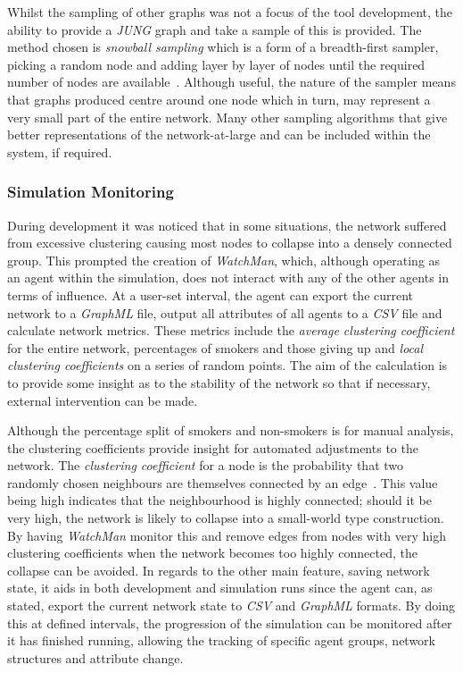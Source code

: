 \documentclass[]{report}
\begin{document}
Whilst the sampling of other graphs was not a focus of the tool development, the ability to provide a \emph{JUNG} graph and take a sample of this is provided. The method chosen is \emph{snowball sampling} which is a form of a breadth-first sampler, picking a random node and adding layer by layer of nodes until the required number of nodes are available~\cite{snowball}. Although useful, the nature of the sampler means that graphs produced centre around one node which in turn, may represent a very small part of the entire network. Many other sampling algorithms that give better representations of the network-at-large and can be included within the system, if required.


\subsubsection{Simulation Monitoring}
During development it was noticed that in some situations, the network suffered from excessive clustering causing most nodes to collapse into a densely connected group. This prompted the creation of \emph{WatchMan}, which, although operating as an agent within the simulation, does not interact with any of the other agents in terms of influence. At a user-set interval, the agent can export the current network to a \emph{GraphML} file, output all attributes of all agents to a \emph{CSV} file and calculate network metrics. These metrics include the \emph{average clustering coefficient} for the entire network, percentages of smokers and those giving up and \emph{local clustering coefficients} on a series of random points. The aim of the calculation is to provide some insight as to the stability of the network so that if necessary, external intervention can be made.

Although the percentage split of smokers and non-smokers is for manual analysis, the clustering coefficients provide insight for automated adjustments to the network. The \emph{clustering coefficient} for a node is the probability that two randomly chosen neighbours are themselves connected by an edge~\cite{NetMark-44-cluster}. This value being high indicates that the neighbourhood is highly connected; should it be very high, the network is likely to collapse into a small-world type construction. By having \emph{WatchMan} monitor this and remove edges from nodes with very high clustering coefficients when the network becomes too highly connected, the collapse can be avoided. In regards to the other main feature, saving network state, it aids in both development and simulation runs since the agent can, as stated, export the current network state to \emph{CSV} and \emph{GraphML} formats. By doing this at defined intervals, the progression of the simulation can be monitored after it has finished running, allowing the tracking of specific agent groups, network structures and attribute change. 
\end{document}
